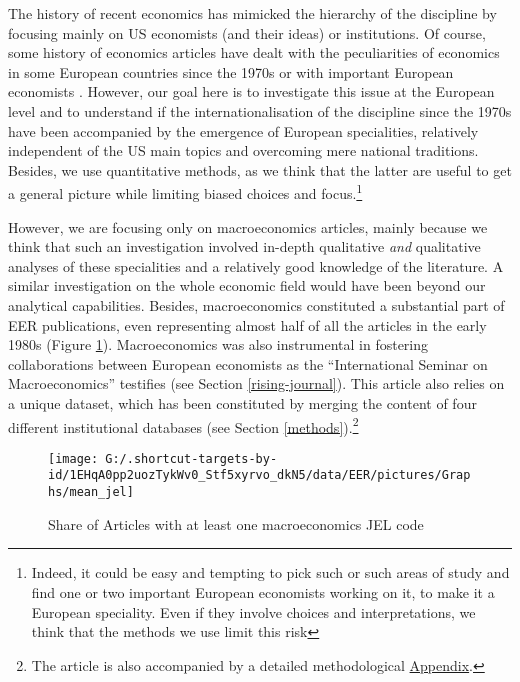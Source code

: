\documentclass[]{elsarticle} %
\begin{document}
The history of recent economics has mimicked the hierarchy of the
discipline by focusing mainly on US economists (and their ideas) or
institutions. Of course, some history of economics articles have dealt
with the peculiarities of economics in some European countries since the
1970s or with important European economists
\citep{maes2005, benest2019}. However, our goal here is to investigate
this issue at the European level and to understand if the
internationalisation of the discipline since the 1970s have been
accompanied by the emergence of European specialities, relatively
independent of the US main topics and overcoming mere national
traditions. Besides, we use quantitative methods, as we think that the
latter are useful to get a general picture while limiting biased choices
and focus.\footnote{Indeed, it could be easy and tempting to pick such
  or such areas of study and find one or two important European
  economists working on it, to make it a European speciality. Even if
  they involve choices and interpretations, we think that the methods we
  use limit this risk}

However, we are focusing only on macroeconomics articles, mainly because
we think that such an investigation involved in-depth qualitative
\emph{and} qualitative analyses of these specialities and a relatively
good knowledge of the literature. A similar investigation on the whole
economic field would have been beyond our analytical capabilities.
Besides, macroeconomics constituted a substantial part of EER
publications, even representing almost half of all the articles in the
early 1980s (Figure \ref{fig:plot-jel}). Macroeconomics was also
instrumental in fostering collaborations between European economists as
the ``International Seminar on Macroeconomics'' testifies (see Section
\ref{rising-journal}). This article also relies on a unique dataset,
which has been constituted by merging the content of four different
institutional databases (see Section \ref{methods}).\footnote{The
  article is also accompanied by a detailed methodological
  \protect\hyperlink{appendix}{Appendix}.}

\begin{figure}[h]

{\centering \texttt{[image: G:/.shortcut-targets-by-id/1EHqA0pp2uozTykWv0\_Stf5xyrvo\_dkN5/data/EER/pictures/Graphs/mean\_jel]} 

}

\caption{Share of Articles with at least one macroeconomics JEL code}\label{fig:plot-jel}
\end{figure}
\end{document}
